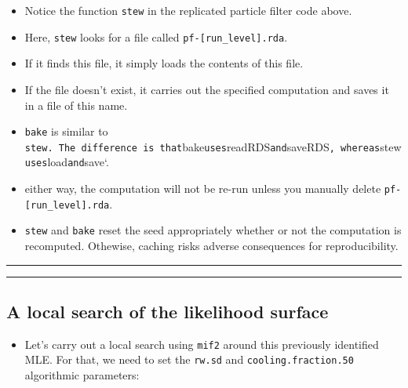 \documentclass[]{article}
\providecommand{\tightlist}{%
  \setlength{\itemsep}{0pt}\setlength{\parskip}{0pt}}
\begin{document}
\begin{itemize}
\item
  Notice the function \texttt{stew} in the replicated particle filter
  code above.
\item
  Here, \texttt{stew} looks for a file called
  \texttt{pf-{[}run\_level{]}.rda}.
\item
  If it finds this file, it simply loads the contents of this file.
\item
  If the file doesn't exist, it carries out the specified computation
  and saves it in a file of this name.
\item
  \texttt{bake} is similar to
  \texttt{stew.\ The\ difference\ is\ that}bake\texttt{uses}readRDS\texttt{and}saveRDS\texttt{,\ whereas}stew\texttt{uses}load\texttt{and}save`.
\item
  either way, the computation will not be re-run unless you manually
  delete \texttt{pf-{[}run\_level{]}.rda}.
\item
  \texttt{stew} and \texttt{bake} reset the seed appropriately whether
  or not the computation is recomputed. Othewise, caching risks adverse
  consequences for reproducibility.
\end{itemize}

\begin{center}\rule{0.5\linewidth}{\linethickness}\end{center}

\begin{center}\rule{0.5\linewidth}{\linethickness}\end{center}

\subsection{A local search of the likelihood
surface}\label{a-local-search-of-the-likelihood-surface}

\begin{itemize}
\tightlist
\item
  Let's carry out a local search using \texttt{mif2} around this
  previously identified MLE. For that, we need to set the \texttt{rw.sd}
  and \texttt{cooling.fraction.50} algorithmic parameters:
\end{itemize}
\end{document}

